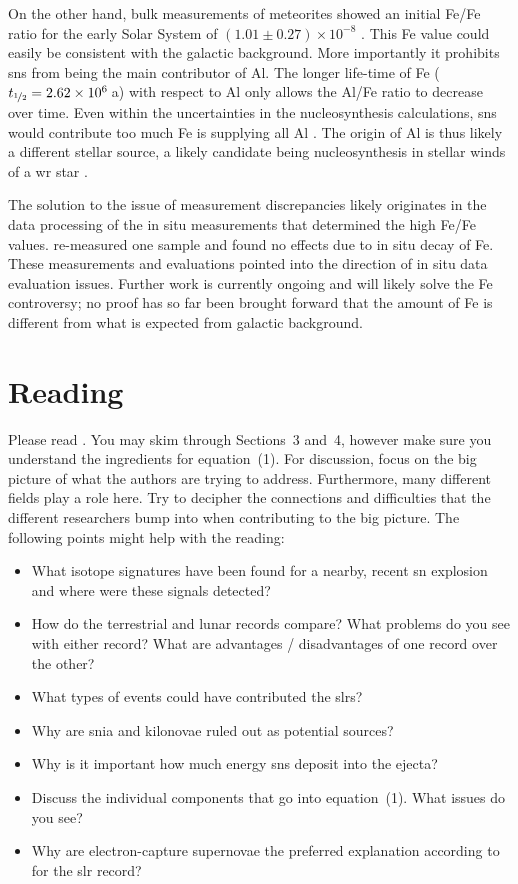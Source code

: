 On the other hand, bulk measurements of meteorites showed an initial Fe/Fe ratio for the early Solar System of $(1.01 \pm 0.27)\times10^{-8}$ \citep{tang12,tang15}. This Fe value could easily be consistent with the galactic background. More importantly it prohibits \acp{sn} from being the main contributor of Al. The longer life-time of Fe ($t_{\nicefrac{1}{2}} = 2.62 \times 10^{6}$\,a) with respect to Al only allows the Al/Fe ratio to decrease over time. Even within the uncertainties in the nucleosynthesis calculations, \acp{sn} would contribute too much Fe is supplying all Al \citep{jones19}. The origin of Al is thus likely a different stellar source, a likely candidate being nucleosynthesis in stellar winds of a \ac{wr} star \citep{dwarkadas17}.

The solution to the issue of measurement discrepancies likely originates in the data processing of the in situ measurements that determined the high Fe/Fe values. \citet{trappitsch18} re-measured one sample and found no effects due to in situ decay of Fe. These measurements and evaluations pointed into the direction of in situ data evaluation issues. Further work is currently ongoing and will likely solve the Fe controversy; no proof has so far been brought forward that the amount of Fe is different from what is expected from galactic background.


\section{Reading}

Please read \citet{fry15}. You may skim through Sections~3 and~4, however make sure you understand the ingredients for equation~(1). For discussion, focus on the big picture of what the authors are trying to address. Furthermore, many different fields play a role here. Try to decipher the connections and difficulties that the different researchers bump into when contributing to the big picture. The following points might help with the reading:

\begin{itemize}
    \item What isotope signatures have been found for a nearby, recent \ac{sn} explosion and where were these signals detected?
    \item How do the terrestrial and lunar records compare? What problems do you see with either record? What are advantages / disadvantages of one record over the other?
    \item What types of events could have contributed the \acp{slr}?
    \item Why are \ac{snia} and kilonovae ruled out as potential sources?
    \item Why is it important how much energy \acp{sn} deposit into the ejecta?
    \item Discuss the individual components that go into equation~(1). What issues do you see?
    \item Why are electron-capture supernovae the preferred explanation according to \citet{fry15} for the \ac{slr} record?
\end{itemize}

